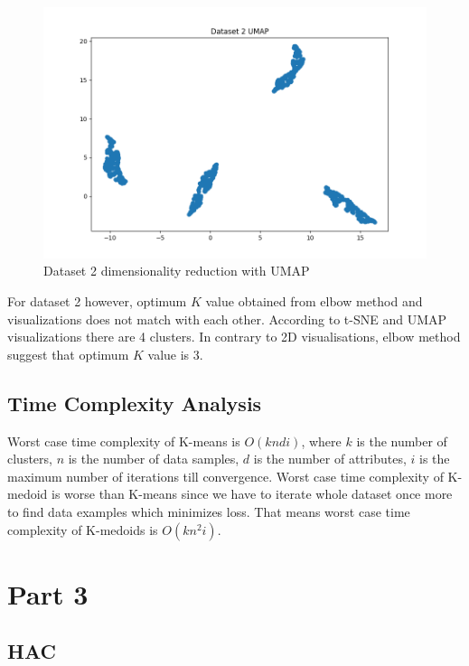 \documentclass[12pt,a4paper, margin=1in]{article}
\begin{document}
\begin{figure}[H]
    \centering
    \includegraphics[scale=0.85]{dataset2_umap.png}
    \caption{Dataset 2 dimensionality reduction with UMAP}
\end{figure}

For dataset 2 however, optimum $K$ value obtained from elbow method and visualizations does not match with each other. According to t-SNE and UMAP visualizations 
there are 4 clusters. In contrary to 2D visualisations, elbow method suggest that optimum $K$ value is 3.

\subsection{Time Complexity Analysis}

Worst case time complexity of K-means is $O(kndi)$, where $k$ is the number of clusters, $n$ is the number of data samples, $d$ is the number of attributes, $i$ is the maximum number of iterations till convergence.
Worst case time complexity of K-medoid is worse than K-means since we have to iterate whole dataset once more to find data examples which minimizes loss. That means worst case time
complexity of K-medoids is $O(kn^2i)$. 

\section{Part 3}

\subsection{HAC}
\end{document}
